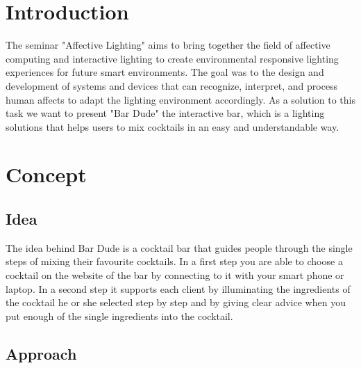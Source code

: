\documentclass{acm_proc_article-sp}
\begin{document}
\maketitle




\section{Introduction}
The seminar "Affective Lighting" aims to bring together the field of affective computing and interactive lighting to create environmental responsive lighting experiences for future smart environments. The goal was to the design and development of systems and devices that can recognize, interpret, and process human affects to adapt the lighting environment accordingly. As a solution to this task we want to present "Bar Dude"  the interactive bar, which is a lighting solutions that helps users to mix cocktails in an easy and understandable way.

\section{Concept}
\subsection{Idea}
The idea behind Bar Dude is a cocktail bar that guides people through the single steps of mixing their favourite cocktails. In a first step you are able to choose a cocktail on the website of the bar by connecting to it with your smart phone or laptop. In a second step it supports each client by illuminating the ingredients of the cocktail he or she selected step by step and by giving clear advice when you put enough of the single ingredients into the cocktail.
\subsection{Approach}
\end{document}
